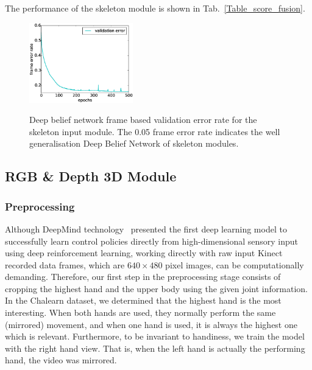 The performance of the skeleton module is shown in Tab.~\ref{Table_score_fusion}.

\begin{figure}[t]
  \centering
  \includegraphics[width=0.4\textwidth]{images/training_error_sk}\\
  \caption{
    Deep belief network frame based validation error rate for the skeleton input module. The 0.05 frame error rate indicates the well generalisation Deep Belief Network of skeleton modules.}
    \label{sk_error_rate}
\end{figure}

\subsection{RGB \& Depth 3D Module} \label{sec:rgbd_modules}
\subsubsection{Preprocessing}\label{3d_preproc}

Although DeepMind technology~\cite{mnih2013playing} presented the first deep learning model to successfully learn control policies directly from high-dimensional sensory input using deep reinforcement learning, working directly with raw input Kinect recorded data frames, which are $640 \times 480$ pixel images, can be computationally demanding.
Therefore, our first step in the preprocessing stage consists of cropping the highest hand and the upper body using the given joint information. In the Chalearn dataset, we determined that the highest hand is the most interesting. When both hands are used, they normally perform the same (mirrored) movement, and when one hand is used, it is always the highest one which is relevant.
Furthermore, to be invariant to handiness, we train the model with the right hand view. That is, when the left hand is actually the performing hand, the video was mirrored.


